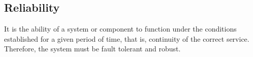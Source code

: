 \subsection{Reliability}

It is the ability of a system or component to function under the conditions established for a given period of time, that is, continuity of the correct service. Therefore, the system must be fault tolerant and robust.